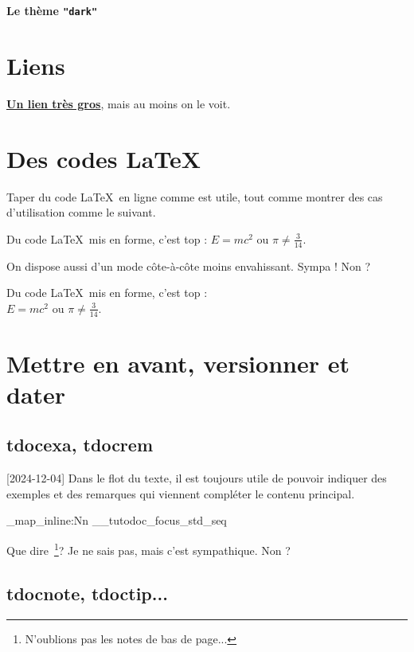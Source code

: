 \documentclass[theme = dark]{tutodoc}
\newcommand\thisstyle{dark}
\newcommand\myexrmktext{
    \tdocversion{1.7.0}[2024-12-04]
    Dans le flot du texte, il est toujours utile de pouvoir indiquer des exemples et des remarques qui viennent compléter le contenu principal.
}
\newcommand\myhighlightedtext{
    Que dire\,%
    \footnote{
        N'oublions pas les notes de bas de page...
    }?
    Je ne sais pas, mais c'est sympathique. Non ?
}
\begin{document}
\textsf{\Huge\bfseries Le thème \texttt{"\thisstyle"}}

\section{Liens}

{\Large\bfseries \href{https://github.com/bc-tools/for-latex/tree/main/tutodoc}{Un lien très gros}}, mais au moins on le voit.



\section{Des codes \LaTeX}

Taper du code \LaTeX\ en ligne comme  est utile, tout comme montrer des cas d'utilisation comme le suivant.

\begin{tdoclatex}
Du code \LaTeX\ mis en forme, c'est top : $E = m c^2$ ou $\pi \neq \frac{3}{14}$.
\end{tdoclatex}


On dispose aussi d'un mode côte-à-côte moins envahissant. Sympa ! Non ?

\begin{tdoclatex}[sbs]
Du code \LaTeX\ mis en forme, c'est top : \\
$E = m c^2$ ou $\pi \neq \frac{3}{14}$.
\end{tdoclatex}



\section{Mettre en avant, versionner et dater}

\subsection{tdocexa, tdocrem}

\myexrmktext

\ExplSyntaxOn

\seq_map_inline:Nn \g__tutodoc_focus_std_seq {
    \begin{tdoc#1}
        \myhighlightedtext
    \end{tdoc#1}
}

\ExplSyntaxOff



\subsection{tdocnote, tdoctip...}
\end{document}
